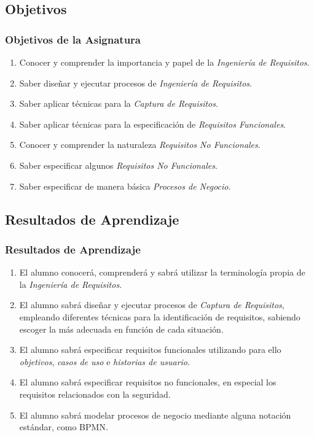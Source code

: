 \documentclass[handout,a4paper,slidestop,xcolor=pst,dvips,blue]{beamer}
\begin{document}
\subsection{Objetivos}

\begin{frame}[c]
	\frametitle{Objetivos de la Asignatura}
    \begin{enumerate}[<+->]
			\item Conocer y comprender la importancia y papel de la \emph{Ingeniería de Requisitos}.
            \item Saber diseñar y ejecutar procesos de \emph{Ingeniería de Requisitos}.
			\item Saber aplicar técnicas para la \emph{Captura de Requisitos}.
			\item Saber aplicar técnicas para la especificación de \emph{Requisitos Funcionales}.
			\item Conocer y comprender la naturaleza \emph{Requisitos No Funcionales}.
			\item Saber especificar algunos \emph{Requisitos No Funcionales}.
			\item Saber especificar de manera básica \emph{Procesos de Negocio}.
	 \end{enumerate}
\end{frame}

\subsection{Resultados de Aprendizaje}

\begin{frame}[c]
	\frametitle{Resultados de Aprendizaje}
    	\begin{enumerate}[<+->]
			\item El alumno conocerá, comprenderá y sabrá utilizar la terminología propia de la \emph{Ingeniería de Requisitos}.
            \item El alumno sabrá diseñar y ejecutar procesos de \emph{Captura de Requisitos}, empleando diferentes técnicas para la identificación de requisitos, sabiendo escoger la más adecuada en función de cada situación.
            \item El alumno sabrá especificar requisitos funcionales utilizando para ello \emph{objetivos}, \emph{casos de uso} e \emph{historias de usuario}.
            \item El alumno sabrá especificar requisitos no funcionales, en especial los requisitos relacionados con la seguridad.
            \item El alumno sabrá modelar procesos de negocio mediante alguna notación estándar, como BPMN.
		\end{enumerate}
\end{frame}
\end{document}
